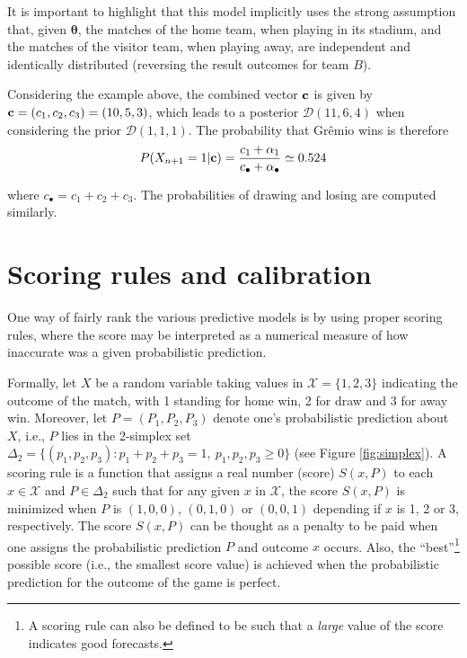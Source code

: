 \documentclass[journal,article,accept,moreauthors,pdftex,12pt,a4paper]{mdpi}
\begin{document}
    It is important to highlight that this model implicitly uses the strong assumption that, given $\boldsymbol{\theta}$, the matches of the home team, when playing in its stadium, and the matches of the visitor team, when playing away, are independent and identically distributed (reversing the result outcomes for team $B$).

    Considering the example above, the combined vector ${\bf c}$ is given by ${\bf c}=(c_1,c_2,c_3)=(10,5,3)$, which leads to a posterior $\mathcal{D}(11,6,4)$ when considering the prior $\mathcal{D}(1,1,1)$.
    The probability that Gr\^emio wins is therefore
    \[P(X_{n+1}=1|{\bf c})=\frac{c_1+\alpha_1}{c_{\bullet}+\alpha_{\bullet}}\simeq0.524
    \]

    \noindent
    where $c_{\bullet}=c_1+c_2+c_3$. The probabilities of drawing and losing are computed similarly.

    \section{Scoring rules and calibration}
    \label{sec::scoring}

    One way of fairly rank the various predictive models is by using proper scoring rules, where
    the score may be interpreted as a numerical measure of how inaccurate was a given probabilistic prediction.

    Formally, let $X$ be a random variable
    taking values in $\mathcal{X}=\{1,2,3\}$ indicating
    the outcome of the match, with 1 standing for home win, 2 for draw and 3 for away win.  Moreover, let $P=(P_1,P_2,P_3)$ denote one's probabilistic prediction
    about $X$, i.e., $P$ lies in the 2-simplex set $\Delta_2=\{(p_1,p_2,p_3):p_1+p_2+p_3=1, \ p_1,p_2,p_3\geq0\}$ (see Figure
    \ref{fig:simplex}).
    A scoring rule is a function
    that assigns a real number (score) $S(x,P)$ to each $x \in \mathcal{X}$
    and $P \in \Delta_2$
    such that
    for any given $x$ in $\mathcal{X}$, the score  $S(x,P)$ is minimized when $P$ is
    $(1,0,0)$, $(0,1,0)$ or $(0,0,1)$ depending if $x$ is 1, 2 or 3, respectively.
    The score $S(x,P)$ can be thought as
    a penalty to be paid when one assigns the
    probabilistic prediction $P$ and outcome
    $x$ occurs. Also, the ``best''\footnote{A scoring rule can also be defined to be such that a \emph{large} value of the score indicates good forecasts.} possible score (i.e., the smallest score value) is achieved when the probabilistic prediction for the outcome of the game is perfect.
\end{document}
